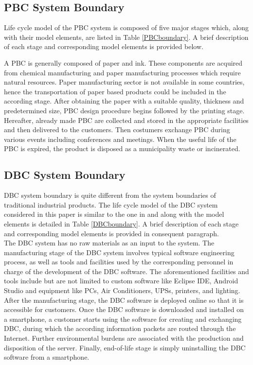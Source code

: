 \documentclass[3p,times,procedia]{elsarticle}
\begin{document}
\subsection{PBC System Boundary} \label{PBCBoundary}
Life cycle model of the PBC system is composed of five major stages which, along with their model elements, are listed in Table \ref{PBCboundary}. A brief description of each stage and corresponding model elements is provided below.

A PBC is generally composed of paper and ink. These components are acquired from chemical manufacturing and paper manufacturing processes which require natural resources. Paper manufacturing sector is not available in some countries, hence the transportation of paper based products could be included in the according stage. After obtaining the paper with a suitable quality, thickness and predetermined size, PBC design procedure begins followed by the printing stage. Hereafter, already made PBC are collected and stored in the appropriate facilities and then delivered to the customers. Then costumers exchange PBC during various events including conferences and meetings. When the useful life of the PBC is expired, the product is disposed as a municipality waste or incinerated.

\subsection{DBC System Boundary}\label{DBCBoundary}

DBC system boundary is quite different from the system boundaries of traditional industrial products. The life cycle model of the DBC system considered in this paper is similar to the one in \cite{Moshnyaga:2013, moshnyaga2013assessment} and along with the model elements is detailed in Table \ref{DBCboundary}. A brief description of each stage and corresponding model elements is provided in consequent paragraph.\\

The DBC system has no raw materials as an input to the system. The manufacturing stage of the DBC system involves typical software engineering process, as well as tools and facilities used by the corresponding personnel in charge of the development of the DBC software. The aforementioned facilities and tools include but are not limited to custom software like Eclipse IDE, Android Studio and equipment like PCs, Air Conditioners, UPSs, printers, and lighting. After the manufacturing stage, the DBC software is deployed online so that it is accessible for customers. Once the DBC software is downloaded and installed on a smartphone, a customer starts using the software for creating and exchanging DBC, during which the according information packets are routed through the Internet. Further environmental burdens are associated with the production and disposition of the server. Finally, end-of-life stage is simply uninstalling the DBC software from a smartphone. 
\end{document}
